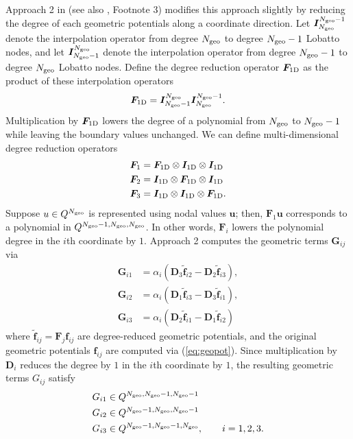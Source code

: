 \documentclass{svjour3}                     %
\renewcommand{\tilde}{\widetilde}
\newcommand{\LRp}[1]{\left( #1 \right)}
\begin{document}
Approach 2 in \cite{kozdon2018energy} (see also \cite{chan2019skew}, Footnote 3) modifies this approach slightly by reducing the degree of each geometric potentials along a coordinate direction.  Let $\bm{I}_{N_{\rm geo}}^{N_{\rm geo}-1}$ denote the interpolation operator from degree $N_{\rm geo}$ to degree $N_{\rm geo}-1$ Lobatto nodes, and let $\bm{I}_{N_{\rm geo}-1}^{N_{\rm geo}}$ denote the interpolation operator from degree $N_{\rm geo}-1$ to degree $N_{\rm geo}$ Lobatto nodes.  Define the degree reduction operator $\bm{F}_{\rm 1D}$ as the product of these interpolation operators
\[
\bm{F}_{\rm 1D} = \bm{I}_{N_{\rm geo}-1}^{N_{\rm geo}}\bm{I}_{N_{\rm geo}}^{N_{\rm geo}-1}.
\]
Multiplication by $\bm{F}_{\rm 1D}$ lowers the degree of a polynomial from $N_{\rm geo}$ to $N_{\rm geo}-1$ while leaving the boundary values unchanged.  We can define multi-dimensional degree reduction operators 
\begin{align*}
\bm{F}_1 &= \bm{F}_{\rm 1D} \otimes \bm{I}_{\rm 1D}\otimes \bm{I}_{\rm 1D}\\
\bm{F}_2 &= \bm{I}_{\rm 1D} \otimes \bm{F}_{\rm 1D}\otimes \bm{I}_{\rm 1D}\\
\bm{F}_3 &= \bm{I}_{\rm 1D} \otimes \bm{I}_{\rm 1D}\otimes \bm{F}_{\rm 1D}.
\end{align*}
Suppose $u \in Q^{N_{\rm geo}}$ is represented using nodal values $\bm{u}$; then, $\bm{F}_1\bm{u}$ corresponds to a polynomial in $Q^{N_{\rm geo}-1,N_{\rm geo},N_{\rm geo}}$.  In other words, $\bm{F}_i$ lowers the polynomial degree in the $i$th coordinate by $1$.  Approach 2 computes the geometric terms $\bm{G}_{ij}$ via
\begin{align*}
\bm{G}_{i1} &= \alpha_i\LRp{\bm{D}_3\tilde{\bm{f}}_{i2} - \bm{D}_2\tilde{\bm{f}}_{i3}},\\
\bm{G}_{i2} &=\alpha_i \LRp{\bm{D}_1\tilde{\bm{f}}_{i3} - \bm{D}_3\tilde{\bm{f}}_{i1}},\\
\bm{G}_{i3} &= \alpha_i\LRp{\bm{D}_2\tilde{\bm{f}}_{i1} - \bm{D}_1\tilde{\bm{f}}_{i2}}
\end{align*}
where $\tilde{\bm{f}}_{ij} = \bm{F}_j \bm{f}_{ij}$ are degree-reduced geometric potentials, and the original geometric potentials $\bm{f}_{ij}$ are computed via (\ref{eq:geopot}).  Since multiplication by $\bm{D}_i$ reduces the degree by $1$ in the $i$th coordinate by $1$, the resulting geometric terms $G_{ij}$ satisfy
\begin{align*}
&G_{i1} \in Q^{N_{\rm geo},N_{\rm geo}-1,N_{\rm geo}-1}\\
&G_{i2} \in Q^{N_{\rm geo}-1,N_{\rm geo},N_{\rm geo}-1}\\
&G_{i3} \in Q^{N_{\rm geo}-1,N_{\rm geo}-1,N_{\rm geo}}, \qquad i = 1,2,3.
\end{align*}
\end{document}

